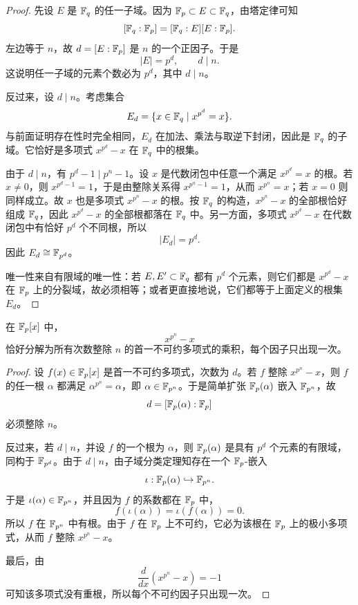 \begin{proof}
先设 $E$ 是 $\mathbb{F}_q$ 的任一子域。因为 $\mathbb{F}_p\subset E\subset \mathbb{F}_q$，由塔定律可知
\[
[\mathbb{F}_q:\mathbb{F}_p]=[\mathbb{F}_q:E][E:\mathbb{F}_p].
\]
左边等于 $n$，故 $d=[E:\mathbb{F}_p]$ 是 $n$ 的一个正因子。于是
\[
|E|=p^d,
\qquad d\mid n.
\]
这说明任一子域的元素个数必为 $p^d$，其中 $d\mid n$。

反过来，设 $d\mid n$。考虑集合
\[
E_d=\{x\in\mathbb{F}_q\mid x^{p^d}=x\}.
\]
与前面证明存在性时完全相同，$E_d$ 在加法、乘法与取逆下封闭，因此是 $\mathbb{F}_q$ 的子域。它恰好是多项式 $x^{p^d}-x$ 在 $\mathbb{F}_q$ 中的根集。

由于 $d\mid n$，有 $p^d-1\mid p^n-1$。设 $x$ 是代数闭包中任意一个满足 $x^{p^d}=x$ 的根。若 $x\ne0$，则 $x^{p^d-1}=1$，于是由整除关系得 $x^{p^n-1}=1$，从而 $x^{p^n}=x$；若 $x=0$ 则同样成立。故 $x$ 也是多项式 $x^{p^n}-x$ 的根。按 $\mathbb{F}_q$ 的构造，$x^{p^n}-x$ 的全部根恰好组成 $\mathbb{F}_q$，因此 $x^{p^d}-x$ 的全部根都落在 $\mathbb{F}_q$ 中。另一方面，多项式 $x^{p^d}-x$ 在代数闭包中有恰好 $p^d$ 个不同根，所以
\[
|E_d|=p^d.
\]
因此 $E_d\cong \mathbb{F}_{p^d}$。

唯一性来自有限域的唯一性：若 $E,E'\subset\mathbb{F}_q$ 都有 $p^d$ 个元素，则它们都是 $x^{p^d}-x$ 在 $\mathbb{F}_p$ 上的分裂域，故必须相等；或者更直接地说，它们都等于上面定义的根集 $E_d$。
\end{proof}

\begin{proposition}
在 $\mathbb{F}_p[x]$ 中，
\[
x^{p^n}-x
\]
恰好分解为所有次数整除 $n$ 的首一不可约多项式的乘积，每个因子只出现一次。
\end{proposition}

\begin{proof}
设 $f(x)\in\mathbb{F}_p[x]$ 是首一不可约多项式，次数为 $d$。若 $f$ 整除 $x^{p^n}-x$，则 $f$ 的任一根 $\alpha$ 都满足 $\alpha^{p^n}=\alpha$，即 $\alpha\in\mathbb{F}_{p^n}$。于是简单扩张 $\mathbb{F}_p(\alpha)$ 嵌入 $\mathbb{F}_{p^n}$，故
\[
d=[\mathbb{F}_p(\alpha):\mathbb{F}_p]
\]
必须整除 $n$。

反过来，若 $d\mid n$，并设 $f$ 的一个根为 $\alpha$，则 $\mathbb{F}_p(\alpha)$ 是具有 $p^d$ 个元素的有限域，同构于 $\mathbb{F}_{p^d}$。由于 $d\mid n$，由子域分类定理知存在一个 $\mathbb{F}_p$-嵌入
\[
\iota:\mathbb{F}_p(\alpha)\hookrightarrow \mathbb{F}_{p^n}.
\]
于是 $\iota(\alpha)\in\mathbb{F}_{p^n}$，并且因为 $f$ 的系数都在 $\mathbb{F}_p$ 中，
\[
f(\iota(\alpha))=\iota(f(\alpha))=0.
\]
所以 $f$ 在 $\mathbb{F}_{p^n}$ 中有根。由于 $f$ 在 $\mathbb{F}_p$ 上不可约，它必为该根在 $\mathbb{F}_p$ 上的极小多项式，从而 $f$ 整除 $x^{p^n}-x$。

最后，由
\[
\frac{d}{dx}(x^{p^n}-x)=-1
\]
可知该多项式没有重根，所以每个不可约因子只出现一次。
\end{proof}

